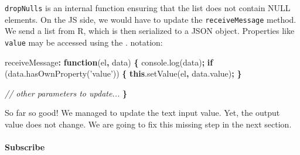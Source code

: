 \documentclass[]{book}
\newenvironment{Shaded}{\begin{snugshade}}{\end{snugshade}}
\newcommand{\AttributeTok}[1]{\textcolor[rgb]{0.77,0.63,0.00}{#1}}
\newcommand{\CommentTok}[1]{\textcolor[rgb]{0.56,0.35,0.01}{\textit{#1}}}
\newcommand{\ControlFlowTok}[1]{\textcolor[rgb]{0.13,0.29,0.53}{\textbf{#1}}}
\newcommand{\DataTypeTok}[1]{\textcolor[rgb]{0.13,0.29,0.53}{#1}}
\newcommand{\KeywordTok}[1]{\textcolor[rgb]{0.13,0.29,0.53}{\textbf{#1}}}
\newcommand{\NormalTok}[1]{#1}
\newcommand{\OperatorTok}[1]{\textcolor[rgb]{0.81,0.36,0.00}{\textbf{#1}}}
\newcommand{\OtherTok}[1]{\textcolor[rgb]{0.56,0.35,0.01}{#1}}
\newcommand{\StringTok}[1]{\textcolor[rgb]{0.31,0.60,0.02}{#1}}
\newcommand{\VariableTok}[1]{\textcolor[rgb]{0.00,0.00,0.00}{#1}}
\let\oldparagraph\paragraph
\renewcommand{\paragraph}[1]{\oldparagraph{#1}\mbox{}}
\begin{document}
\begin{Shaded}
\end{Shaded}

\texttt{dropNulls} is an internal function ensuring that the list does not contain NULL elements. On the JS side, we would have to update the \texttt{receiveMessage} method. We send a list from R, which is then serialized to a JSON object. Properties like \texttt{value} may be accessed using the . notation:

\begin{Shaded}
\begin{Highlighting}[]
\NormalTok{receiveMessage}\OperatorTok{:} \KeywordTok{function}\NormalTok{(el}\OperatorTok{,}\NormalTok{ data) }\OperatorTok{\{}
  \VariableTok{console}\NormalTok{.}\AttributeTok{log}\NormalTok{(data)}\OperatorTok{;}
  \ControlFlowTok{if}\NormalTok{ (}\VariableTok{data}\NormalTok{.}\AttributeTok{hasOwnProperty}\NormalTok{(}\StringTok{'value'}\NormalTok{)) }\OperatorTok{\{}
    \KeywordTok{this}\NormalTok{.}\AttributeTok{setValue}\NormalTok{(el}\OperatorTok{,} \VariableTok{data}\NormalTok{.}\AttributeTok{value}\NormalTok{)}\OperatorTok{;}
  \OperatorTok{\}}
  
  \CommentTok{// other parameters to update...}
\OperatorTok{\}}
\end{Highlighting}
\end{Shaded}

So far so good! We managed to update the text input value. Yet, the output value does not change. We are going to fix this missing step in the next section.

\hypertarget{subscribe}{%
\paragraph{Subscribe}\label{subscribe}}
\end{document}
